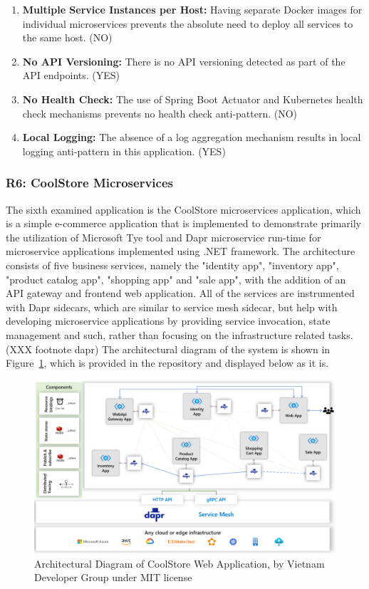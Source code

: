 \documentclass{Configuration_Files/PoliMi3i_thesis}
\begin{document}
\begin{enumerate}
    \item \textbf{Multiple Service Instances per Host:} Having separate Docker images for individual microservices prevents the absolute need to deploy all services to the same host. (NO)
    
    \item \textbf{No API Versioning:} There is no API versioning detected as part of the API endpoints. (YES)
    
    \item \textbf{No Health Check:} The use of Spring Boot Actuator and Kubernetes health check mechanisms prevents no health check anti-pattern. (NO)
    
    \item \textbf{Local Logging:} The absence of a log aggregation mechanism results in local logging anti-pattern in this application. (YES)
\end{enumerate}

\subsubsection{R6: CoolStore Microservices}
\label{subsubsec:R6}

The sixth examined application is the CoolStore microservices application, which is a simple e-commerce application that is implemented to demonstrate primarily the utilization of Microsoft Tye tool and Dapr microservice run-time for microservice applications implemented using .NET framework.
The architecture consists of five business services, namely the "identity app", "inventory app", "product catalog app", "shopping app" and "sale app", with the addition of an API gateway and frontend web application.
All of the services are instrumented with Dapr sidecars, which are similar to service mesh sidecar, but help with developing microservice applications by providing service invocation, state management and such, rather than focusing on the infrastructure related tasks. (XXX footnote dapr)
The architectural diagram of the system is shown in Figure~\ref{fig:R6_arch}, which is provided in the repository and displayed below as it is.

\begin{figure}[H]
\centering
\includegraphics[width=1\textwidth]{myImages/R6.png}
\caption{Architectural Diagram of CoolStore Web Application, by Vietnam Developer Group under MIT license}
\label{fig:R6_arch}
\end{figure}
\end{document}
